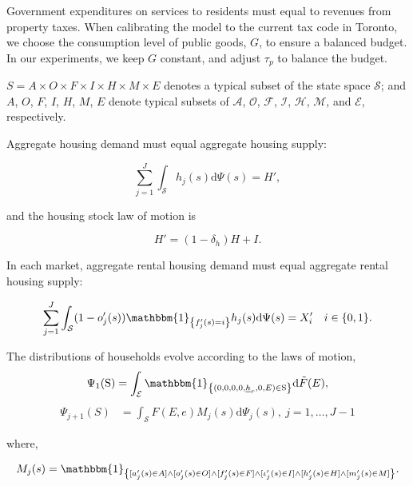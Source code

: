 \documentclass[parskip=full]{article}
\newcommand{\indicator}[1]{\mathbbm{1}_{\left\{ {#1} \right\} }}
\begin{document}
\noindent Government expenditures on services to residents must equal to revenues from property taxes. When calibrating the model to the current tax code in Toronto, we choose the consumption level of public goods, $G$, to ensure a balanced budget. In our experiments, we keep $G$ constant, and adjust $\tau_{p}$ to balance the budget. 

$S=A\times O \times F \times I \times H\times M\times E$ denotes a typical subset of the state space $\mathcal{S}$; and $A$, $O$, $F$, $I$, $H$, $M$, $E$ denote typical subsets of $\mathcal{A}$, $\mathcal{O}$, $\mathcal{F}$, $\mathcal{I}$, $\mathcal{H}$, $\mathcal{M}$, and $\mathcal{E}$, respectively.

Aggregate housing demand must equal aggregate housing supply:

\begin{equation}
\label{eq:housing_clearing_condition}
  \sum_{j=1}^J \int_\mathcal{S} h_{j}(s) \mathrm{d}\Psi(s) = H',
\end{equation}

\noindent and the housing stock law of motion is 

\begin{equation}\label{eq:housing_stock_lom}
H'=(1-\delta_h)H + I.
\end{equation}

\noindent In each market, aggregate rental housing demand must equal aggregate rental housing supply:

\begin{equation}
\label{eq:rental_housing_clearing_condition}
  \sum_{j=1}^J \int_\mathcal{S} (1-o'_{j}(s))\indicator{f'_{j}(s)=i}h_{j}(s) \mathrm{d}\Psi(s) = X'_{i} \quad i \in \{0,1\}.
\end{equation}

The distributions of households evolve according to the laws of motion,
\begin{align}
\Psi_{1}(\mathrm{S})=\int_{\mathcal{E}}\indicator{(0,0,0,0,\underline{h}_{r},0,E)\in \mathrm{S}}\mathrm{d} \tilde{F}(E),\label{eq:lom2}
\end{align}
\begin{align}
\Psi_{j+1}(S) &=\int_{\mathcal{S}} F(E,e)M_{j}(s)\mathrm{d}\Psi_{j}(s),\ j=1,\ldots,J-1\label{eq:lom1}
\end{align}

\noindent where,

\begin{align}
    M_{j}(s) = \indicator{[a'_{j}(s)\in A] \land [o'_{j}(s)\in O] \land [f'_{j}(s)\in F] \land [\iota'_{j}(s)\in I] \land [h'_{j}(s) \in H] \land [m'_{j}(s) \in M]}.\notag
\end{align}
\end{document}
